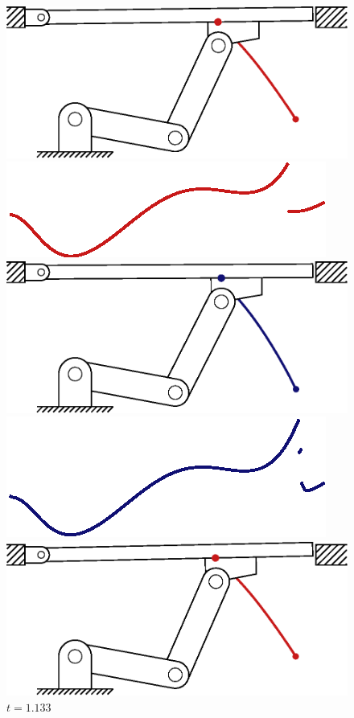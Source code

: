 \documentclass[../DC2019003Bouma.tex]{subfiles}
\begin{document}
\begin{figure}[bt!]
\begin{minipage}[c]{.3\textwidth}
\centering
    \includegraphics[width=\textwidth]{reference/frame33.eps}
	\begin{flushleft}
    \includegraphics[scale=0.55]{reference/refsnap_t113.eps}
	\end{flushleft}
    \includegraphics[width=\textwidth]{tracking/frame33.eps}
	\begin{flushleft}
    \includegraphics[scale=0.55]{tracking/trcsnap_t113.eps}
	\end{flushleft}
	\caption*{$t=1.133$}
\end{minipage}
\begin{minipage}[c]{.3\textwidth}
\centering
    \includegraphics[width=\textwidth]{reference/frame34.eps}

\end{minipage}
\end{figure}
\end{document}
